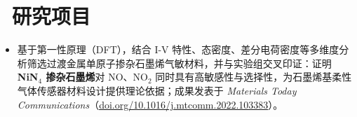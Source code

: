 \documentclass{resume}
\begin{document}
\section{\texorpdfstring{\faFlask\ }{}研究项目}

\begin{itemize}
  \item 基于第一性原理（DFT），结合 I-V 特性、态密度、差分电荷密度等多维度分析筛选过渡金属单原子掺杂石墨烯气敏材料，并与实验组交叉印证：证明 \textbf{NiN$_4$ 掺杂石墨烯}对 NO、NO$_2$ 同时具有高敏感性与选择性，为石墨烯基柔性气体传感器材料设计提供理论依据；成果发表于 \textit{Materials Today Communications}（\href{https://doi.org/10.1016/j.mtcomm.2022.103383}{doi.org/10.1016/j.mtcomm.2022.103383}）。
\end{itemize}
\end{document}
